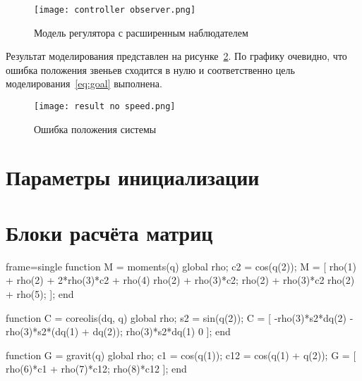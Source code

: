 \documentclass[14pt]{extarticle}
\begin{document}
    \begin{figure}[H]
        \centering
        \texttt{[image: controller observer.png]}
        \caption{Модель регулятора с расширенным наблюдателем}
        \label{pic:controller observer}
    \end{figure}

    Результат моделирования представлен на рисунке~\ref{pic:result no speed}. По графику очевидно, что ошибка
    положения звеньев сходится в нулю и соответственно цель моделирования~\eqref{eq:goal} выполнена.
    \begin{figure}[H]
        \centering
        \texttt{[image: result no speed.png]}
        \caption{Ошибка положения системы}
        \label{pic:result no speed}
    \end{figure}

    \appendix \newpage
    \renewcommand{\thesection}{Приложение \Asbuk{section}}
    \section{Параметры инициализации}\label{code:given}

    \newpage
    \section{Блоки расчёта матриц}\label{code:matricies}
    \begin{octavecode*}{frame=single}
        function M = moments(q)
            global rho;
            c2 = cos(q(2));
            M = [
                rho(1) + rho(2) + 2*rho(3)*c2 + rho(4) rho(2) + rho(3)*c2;
                rho(2) + rho(3)*c2 rho(2) + rho(5);
                ];
        end

        function C = coreolis(dq, q)
            global rho;
            s2 = sin(q(2));
            C = [
                -rho(3)*s2*dq(2) -rho(3)*s2*(dq(1) + dq(2));
                rho(3)*s2*dq(1) 0
                ];
        end

        function G = gravit(q)
            global rho;
            c1 = cos(q(1));
            c12 = cos(q(1) + q(2));
            G = [
                rho(6)*c1 + rho(7)*c12;
                rho(8)*c12
                ];
        end
    \end{octavecode*}
\end{document}
